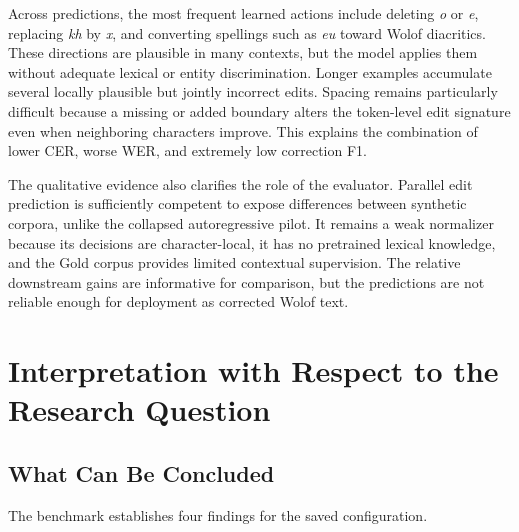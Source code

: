 \documentclass[12pt, a4paper, twoside, openany]{report}
\begin{document}
Across predictions, the most frequent learned actions include deleting \textit{o} or \textit{e}, replacing \textit{kh} by \textit{x}, and converting spellings such as \textit{eu} toward Wolof diacritics. These directions are plausible in many contexts, but the model applies them without adequate lexical or entity discrimination. Longer examples accumulate several locally plausible but jointly incorrect edits. Spacing remains particularly difficult because a missing or added boundary alters the token-level edit signature even when neighboring characters improve. This explains the combination of lower CER, worse WER, and extremely low correction F1.

The qualitative evidence also clarifies the role of the evaluator. Parallel edit prediction is sufficiently competent to expose differences between synthetic corpora, unlike the collapsed autoregressive pilot. It remains a weak normalizer because its decisions are character-local, it has no pretrained lexical knowledge, and the Gold corpus provides limited contextual supervision. The relative downstream gains are informative for comparison, but the predictions are not reliable enough for deployment as corrected Wolof text.


\section{Interpretation with Respect to the Research Question}

\subsection{What Can Be Concluded}

The benchmark establishes four findings for the saved configuration.
\end{document}
